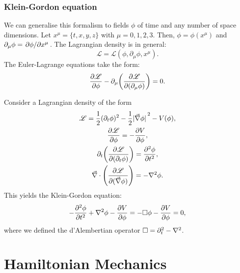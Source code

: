 \documentclass{article}
\begin{document}
\subsubsection*{Klein-Gordon equation}
We can generalise this formalism to fields $ \phi $ of time and any number of space dimensions. Let $ x^{\mu} = \{t, x, y, z\} $ with $ \mu = 0,1,2,3 $. Then, $ \phi = \phi(x^{\mu}) $ and $ \partial_{\mu}\phi = \pdv*{\phi}{x^\mu} $. The Lagrangian density is in general:
\[
	\mathscr{L} = \mathscr{L}(\phi, \partial_{\mu}\phi, x^{\mu}).
\]
The Euler-Lagrange equations take the form:
\begin{equation}
	\pdv{\mathscr{L}}{\phi} - \partial_{\mu}\qty(\pdv{\mathscr{L}}{(\partial_{\mu} \phi) }) = 0.
\end{equation}
\par
Consider a Lagrangian density of the form
\begin{gather}
	\mathscr{L} = \frac{1}{2} (\partial_{t}\phi)^{2} - \frac{1}{2} \abs*{\grad{\phi}}^{2} - V(\phi), \\
	\pdv{\mathscr{L}}{\phi} = - \pdv{V}{\phi}, \\
	\partial_{t}\qty(\pdv{\mathscr{L}}{(\partial_{t}\phi)}) = \pdv[2]{\phi}{t}, \\
	\div{\qty(\pdv{\mathscr{L}}{(\grad{\phi})})} = - \laplacian{\phi}.
\end{gather}
This yields the Klein-Gordon equation:
\begin{equation}
	-\pdv[2]{\phi}{t} + \laplacian{\phi} - \pdv{V}{\phi} = -\Box \phi - \pdv{V}{\phi} = 0,
\end{equation}
where we defined the d’Alembertian operator $ \Box = \partial_{t}^{2} - \laplacian $.
\newpage
\section{Hamiltonian Mechanics}
\end{document}
